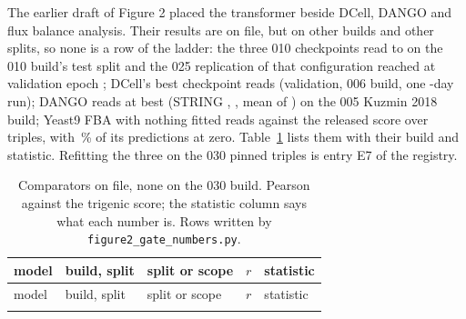  The earlier draft of Figure 2 placed the
transformer beside DCell, DANGO and flux balance analysis. Their results are on file,
but on other builds and other splits, so none is a row of the ladder: the three 010
checkpoints read \gcgtOldTestMin{} to \gcgtOldTestMax{} on the 010 build's test split
and the 025 replication of that configuration reached \gcgtRepValBest{} at validation
epoch \gcgtRepBestEpoch{}; DCell's best checkpoint reads \gdcellBestVal{} (validation,
006 build, one \gdcellDays{}-day run); DANGO reads \gdangoBestMean{} at best (STRING
\gdangoBestRelease{}, \gdangoBestSchedule{}, mean of \gdangoBestN{}) on the 005 Kuzmin
2018 build; Yeast9 FBA with nothing fitted reads \gfbaPearson{} against the released
score over \gfbaN{} triples, with \gfbaFracZero{}\,\% of its predictions at zero.
Table~\ref{tab:comparators} lists them with their build and statistic. Refitting the
three on the 030 pinned triples is entry E7 of the registry.

{\footnotesize
\begin{longtable}{@{}>{\raggedright\arraybackslash}p{44mm}>{\raggedright\arraybackslash}p{30mm}>{\raggedright\arraybackslash}p{28mm}r>{\raggedright\arraybackslash}p{40mm}@{}}
\caption[]{Comparators on file, none on the 030 build. Pearson against the trigenic
score; the statistic column says what each number is. Rows written by
\texttt{figure2\_gate\_numbers.py}.}
\label{tab:comparators}\\
\toprule
model & build, split & split or scope & $r$ & statistic \\
\midrule
\endfirsthead
\toprule
model & build, split & split or scope & $r$ & statistic \\
\midrule
\endhead
\bottomrule
\endlastfoot

\end{longtable}}
